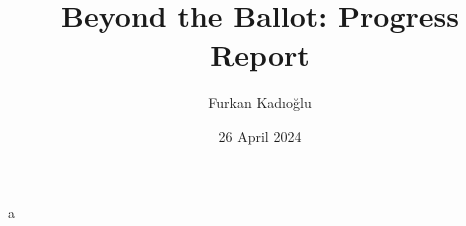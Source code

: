 \documentclass{article}
\title{Beyond the Ballot: Progress Report}
\author{Furkan Kadıoğlu}
\date{26 April 2024}
\begin{document}
\maketitle

a


% 
% 
\end{document}
